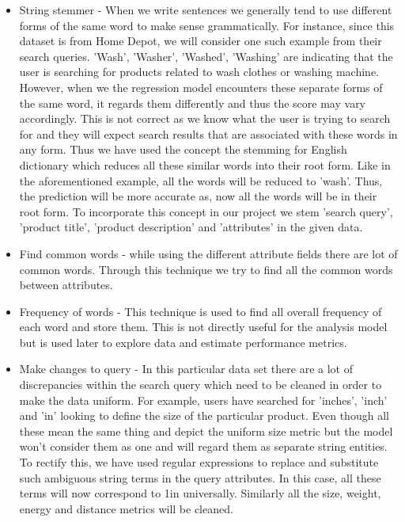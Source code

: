 \documentclass{sig-alternate-05-2015}
\begin{document}
\begin{itemize}
    \item String stemmer - When we write sentences we generally tend to use different forms of the same word to make sense grammatically. For instance, since this dataset is from Home Depot, we will consider one such example from their search queries. 'Wash', 'Washer', 'Washed', 'Washing' are indicating that the user is searching for products related to wash clothes or washing machine. However, when we the regression model encounters these separate forms of the same word, it regards them differently and thus the score may vary accordingly. This is not correct as we know what the user is trying to search for and they will expect search results that are associated with these words in any form. Thus we have used the concept the stemming for English dictionary which reduces all these similar words into their root form. Like in the aforementioned example, all the words will be reduced to 'wash'. Thus, the prediction will be more accurate as, now all the words will be in their root form. To incorporate this concept in our project we stem 'search query', 'product title', 'product description' and 'attributes' in the given data.
    
    \item Find common words - while using the different attribute fields there are lot of common words. Through this technique we try to find all the common words between attributes. 
    
    \item Frequency of words - This technique is used to find all overall frequency of each word and store them. This is not directly useful for the analysis model but is used later to explore data and estimate performance metrics. 
    
    \item Make changes to query - In this particular data set there are a lot of discrepancies within the search query which need to be cleaned in order to make the data uniform. For example, users have searched for 'inches', 'inch' and 'in' looking to define the size of the particular product. Even though all these mean the same thing and depict the uniform size metric but the model won't consider them as one and will regard them as separate string entities. To rectify this, we have used regular expressions to replace and substitute such ambiguous string terms in the query attributes. In this case, all these terms will now correspond to 1in universally. Similarly all the size, weight, energy and distance metrics will be cleaned.  
    

\end{itemize}
\end{document}

